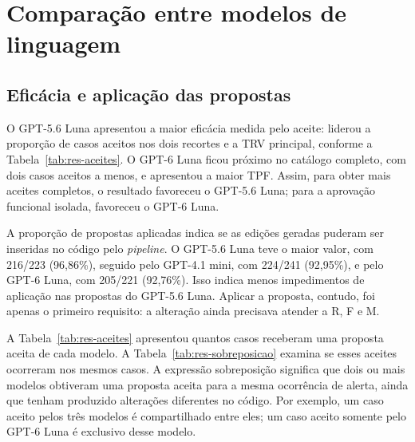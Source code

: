 \section{Comparação entre modelos de linguagem}

\label{sec:res-modelos}

\subsection{Eficácia e aplicação das propostas}

\label{sec:res-eficacia}

O GPT-5.6 Luna apresentou a maior eficácia medida pelo aceite: liderou a proporção de casos aceitos nos dois recortes e a TRV principal, conforme a Tabela~\ref{tab:res-aceites}. O GPT-6 Luna ficou próximo no catálogo completo, com dois casos aceitos a menos, e apresentou a maior TPF. Assim, para obter mais aceites completos, o resultado favoreceu o GPT-5.6 Luna; para a aprovação funcional isolada, favoreceu o GPT-6 Luna.

A proporção de propostas aplicadas indica se as edições geradas puderam ser inseridas no código pelo \textit{pipeline}. O GPT-5.6 Luna teve o maior valor, com 216/223 (96,86\%), seguido pelo GPT-4.1 mini, com 224/241 (92,95\%), e pelo GPT-6 Luna, com 205/221 (92,76\%). Isso indica menos impedimentos de aplicação nas propostas do GPT-5.6 Luna. Aplicar a proposta, contudo, foi apenas o primeiro requisito: a alteração ainda precisava atender a R, F e M.

A Tabela~\ref{tab:res-aceites} apresentou quantos casos receberam uma proposta aceita de cada modelo. A Tabela~\ref{tab:res-sobreposicao} examina se esses aceites ocorreram nos mesmos casos. A expressão sobreposição significa que dois ou mais modelos obtiveram uma proposta aceita para a mesma ocorrência de alerta, ainda que tenham produzido alterações diferentes no código. Por exemplo, um caso aceito pelos três modelos é compartilhado entre eles; um caso aceito somente pelo GPT-6 Luna é exclusivo desse modelo.

